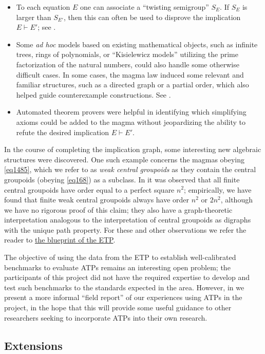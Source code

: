 \begin{itemize}
        \item To each equation $E$ one can associate a ``twisting semigroup'' $S_E$.  If $S_E$ is larger than $S_{E'}$, then this can often be used to disprove the implication $E \vdash E'$; see .
        \item Some \emph{ad hoc} models based on existing mathematical objects, such as infinite trees, rings of polynomials, or ``Kisielewicz models'' utilizing the prime factorization of the natural numbers, could also handle some otherwise difficult cases.  In some cases, the magma law induced some relevant and familiar structures, such as a directed graph or a partial order, which also helped guide counterexample constructions. See .
        \item Automated theorem provers were helpful in identifying which simplifying axioms could be added to the magma without jeopardizing the ability to refute the desired implication $E \vdash E'$.
\end{itemize}

In the course of completing the implication graph, some interesting new algebraic structures were discovered.  One such example concerns the magmas obeying \eqref{eq1485}, which we refer to as \emph{weak central groupoids} as they contain the central groupoids (obeying \eqref{eq168}) as a subclass.  In \cite{knuth} it was observed that all finite central groupoids have order equal to a perfect square $n^2$; empirically, we have found that finite weak central groupoids always have order $n^2$ or $2n^2$, although we have no rigorous proof of this claim; they also have a graph-theoretic interpretation analogous to the interpretation of central groupoids as digraphs with the unique path property.  For these and other observations we refer the reader to \href{https://teorth.github.io/equational_theories/blueprint/weak-central-groupoids-chapter.html}{the blueprint of the ETP}.

The objective of using the data from the ETP to establish well-calibrated benchmarks to evaluate ATPs remains an interesting open problem; the participants of this project did not have the required expertise to develop and test such benchmarks to the standards expected in the area.  However, in  we present a more informal ``field report'' of our experiences using ATPs in the project, in the hope that this will provide some useful guidance to other researchers seeking to incorporate ATPs into their own research.


\subsection{Extensions}

